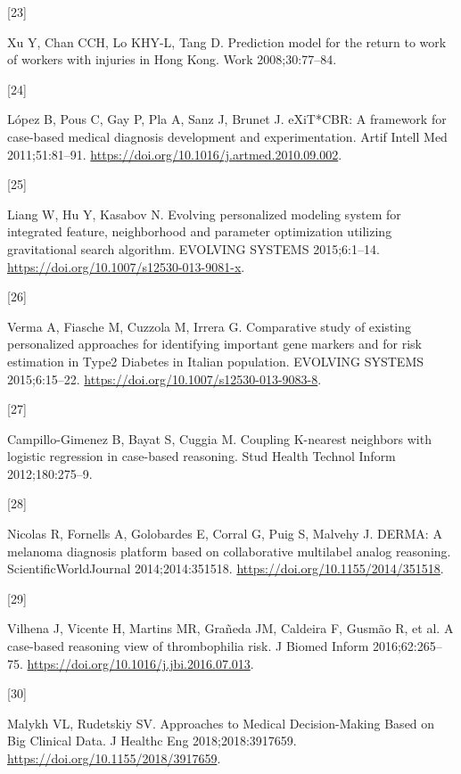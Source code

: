 \documentclass[preprint, 3p,
authoryear]{elsarticle} %
\newlength{\cslhangindent}
\newlength{\csllabelwidth}
\newlength{\cslentryspacingunit} %
\newenvironment{CSLReferences}[2] %
 {%
  \setlength{\parindent}{0pt}
  \ifodd #1
  \let\oldpar\par
  \def\par{\hangindent=\cslhangindent\oldpar}
  \fi
  \setlength{\parskip}{#2\cslentryspacingunit}
 }%
 {}
\newcommand{\CSLLeftMargin}[1]{\parbox[t]{\csllabelwidth}{#1}}
\newcommand{\CSLRightInline}[1]{\parbox[t]{\linewidth - \csllabelwidth}{#1}\break}
\begin{document}
\begin{CSLReferences}{0}{0}
\leavevmode{}%
\CSLLeftMargin{{[}23{]} }%
\CSLRightInline{Xu Y, Chan CCH, Lo KHY-L, Tang D. Prediction model for
the return to work of workers with injuries in {Hong Kong}. Work
2008;30:77--84.}

\leavevmode{}%
\CSLLeftMargin{{[}24{]} }%
\CSLRightInline{López B, Pous C, Gay P, Pla A, Sanz J, Brunet J.
{eXiT}*{CBR}: {A} framework for case-based medical diagnosis development
and experimentation. Artif Intell Med 2011;51:81--91.
\url{https://doi.org/10.1016/j.artmed.2010.09.002}.}

\leavevmode{}%
\CSLLeftMargin{{[}25{]} }%
\CSLRightInline{Liang W, Hu Y, Kasabov N. Evolving personalized modeling
system for integrated feature, neighborhood and parameter optimization
utilizing gravitational search algorithm. EVOLVING SYSTEMS 2015;6:1--14.
\url{https://doi.org/10.1007/s12530-013-9081-x}.}

\leavevmode{}%
\CSLLeftMargin{{[}26{]} }%
\CSLRightInline{Verma A, Fiasche M, Cuzzola M, Irrera G. Comparative
study of existing personalized approaches for identifying important gene
markers and for risk estimation in {Type2 Diabetes} in {Italian}
population. EVOLVING SYSTEMS 2015;6:15--22.
\url{https://doi.org/10.1007/s12530-013-9083-8}.}

\leavevmode{}%
\CSLLeftMargin{{[}27{]} }%
\CSLRightInline{Campillo-Gimenez B, Bayat S, Cuggia M. Coupling
{K-nearest} neighbors with logistic regression in case-based reasoning.
Stud Health Technol Inform 2012;180:275--9.}

\leavevmode{}%
\CSLLeftMargin{{[}28{]} }%
\CSLRightInline{Nicolas R, Fornells A, Golobardes E, Corral G, Puig S,
Malvehy J. {DERMA}: A melanoma diagnosis platform based on collaborative
multilabel analog reasoning. ScientificWorldJournal 2014;2014:351518.
\url{https://doi.org/10.1155/2014/351518}.}

\leavevmode{}%
\CSLLeftMargin{{[}29{]} }%
\CSLRightInline{Vilhena J, Vicente H, Martins MR, Grañeda JM, Caldeira
F, Gusmão R, et al. A case-based reasoning view of thrombophilia risk. J
Biomed Inform 2016;62:265--75.
\url{https://doi.org/10.1016/j.jbi.2016.07.013}.}

\leavevmode{}%
\CSLLeftMargin{{[}30{]} }%
\CSLRightInline{Malykh VL, Rudetskiy SV. Approaches to {Medical
Decision-Making Based} on {Big Clinical Data}. J Healthc Eng
2018;2018:3917659. \url{https://doi.org/10.1155/2018/3917659}.}


\end{CSLReferences}
\end{document}
